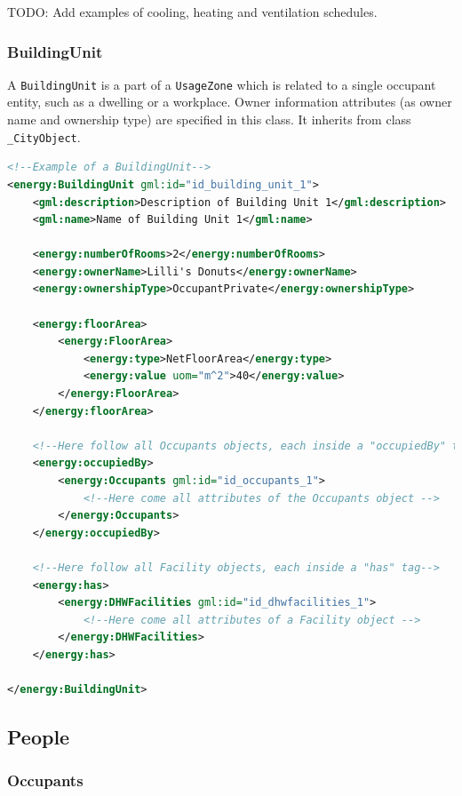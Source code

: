 \documentclass[a4paper,12pt]{article}
\begin{document}
TODO: Add examples of cooling, heating and ventilation schedules.

\subsubsection{BuildingUnit}\label{buildingunit}

A \lstinline!BuildingUnit! is a part of a \lstinline!UsageZone! which is
related to a single occupant entity, such as a dwelling or a workplace.
Owner information attributes (as owner name and ownership type) are
specified in this class. It inherits from class \lstinline!_CityObject!.

\begin{lstlisting}[language=XML]
<!--Example of a BuildingUnit-->
<energy:BuildingUnit gml:id="id_building_unit_1">
    <gml:description>Description of Building Unit 1</gml:description>
    <gml:name>Name of Building Unit 1</gml:name>

    <energy:numberOfRooms>2</energy:numberOfRooms>
    <energy:ownerName>Lilli's Donuts</energy:ownerName>
    <energy:ownershipType>OccupantPrivate</energy:ownershipType>

    <energy:floorArea>
        <energy:FloorArea>
            <energy:type>NetFloorArea</energy:type>
            <energy:value uom="m^2">40</energy:value>
        </energy:FloorArea>
    </energy:floorArea>

    <!--Here follow all Occupants objects, each inside a "occupiedBy" tag-->
    <energy:occupiedBy>
        <energy:Occupants gml:id="id_occupants_1">
            <!--Here come all attributes of the Occupants object -->
        </energy:Occupants>
    </energy:occupiedBy>

    <!--Here follow all Facility objects, each inside a "has" tag-->
    <energy:has>
        <energy:DHWFacilities gml:id="id_dhwfacilities_1">
            <!--Here come all attributes of a Facility object -->
        </energy:DHWFacilities>
    </energy:has>

</energy:BuildingUnit>
\end{lstlisting}

\subsection{People}\label{people}

\subsubsection{Occupants}\label{occupants}
\end{document}
